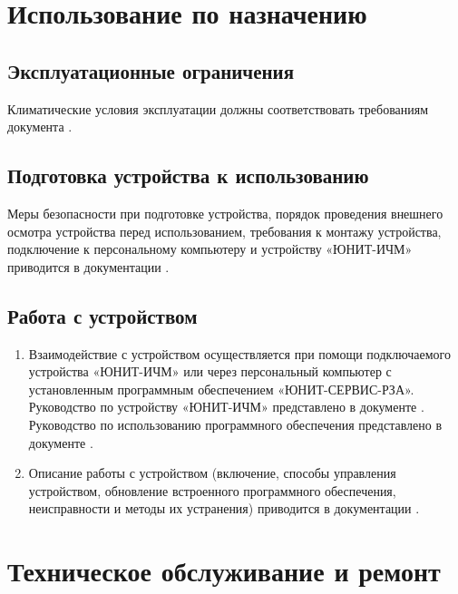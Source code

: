 {\color{unimain}\section[Использование по назначению]{Использование по назначению}\label{sec:using}}

{\color{unimain}\subsection{Эксплуатационные ограничения}}
Климатические условия эксплуатации должны соответствовать требованиям документа \ManualUnitGeneral.

{\color{unimain}\subsection{Подготовка устройства к использованию}}
Меры безопасности при подготовке устройства, порядок проведения внешнего осмотра устройства перед использованием, требования к монтажу устройства, подключение к персональному компьютеру и устройству «ЮНИТ-ИЧМ» приводится в документации \ManualUnitGeneral.

{\color{unimain}\subsection{Работа с устройством}}
\begin{enumerate}
\item Взаимодействие с устройством осуществляется при помощи подключаемого устройства «ЮНИТ-ИЧМ» или через персональный компьютер с установленным программным обеспечением «ЮНИТ-СЕРВИС-РЗА». Руководство по устройству «ЮНИТ-ИЧМ» представлено в документе \ManualUnitHMI. Руководство по использованию программного обеспечения представлено в документе \ManualUnitSRZA.

\item Описание работы с устройством (включение, способы управления устройством, обновление встроенного программного обеспечения, неисправности и методы их устранения) приводится в документации \ManualUnitGeneral.
\end{enumerate}

{\color{unimain}\section[Техническое обслуживание и ремонт]{Техническое обслуживание и ремонт}\label{sec:techrepair}}

